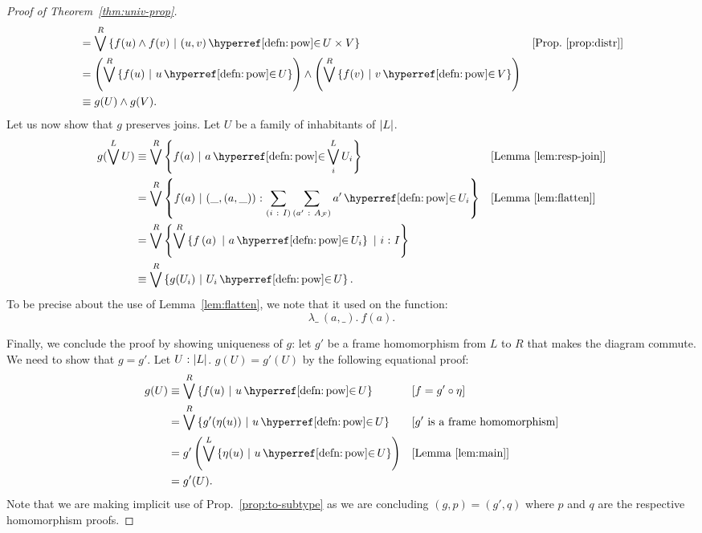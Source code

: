 \begin{proof}[Proof of Theorem~\ref{thm:univ-prop}]
\begin{align*}
             &= \bigvee^R \setof{ f(u) \wedge f(v) ~|~ (u, v) \mempownm U \times V }
               &&\text{[Prop.~\ref{prop:distr}]}                                    \\
             &= \left( \bigvee^R \setof{ f(u) ~|~ u \mempownm U } \right)
              \wedge \left( \bigvee^R \setof{ f(v) ~|~ v \mempownm V } \right)                 \\
             &\equiv g(U) \wedge g(V)                                                         .
  \end{align*}
  Let us now show that $g$ preserves joins. Let $U$ be a family of inhabitants of
  $\left| L \right|$.
  \begin{align*}
    g(\bigvee^L U) &\equiv \bigvee^R \setof{ f(a) ~|~ a \mempownm \bigvee^L_i U_i }
                && [\text{Lemma~\ref{lem:resp-join}}]\\
    &= \bigvee^R \setof{ f(a) ~|~ \oftyI{(\_, (a, \_))}{\sigmaty{i}{I}{\sigmaty{a'}{A_{\McF{}}}{a' \mempownm U_i}}} }
                && [\text{Lemma~\ref{lem:flatten}}] \\
             &= \bigvee^R \setof{ \bigvee^R \img{f}{U_i} ~|~ \oftyI{i}{I} } \\
             &\equiv \bigvee^R \setof{ g(U_i) ~|~ U_i \mempownm U }.
  \end{align*}
  To be precise about the use of Lemma~\ref{lem:flatten}, we note that it used on the
  function:
  \begin{equation*}
    \lambda\_~(a, \_).~f(a).
  \end{equation*}

  Finally, we conclude the proof by showing uniqueness of $g$: let $g'$ be a frame
  homomorphism from $L$ to $R$ that makes the diagram commute. We need to show that
  $g = g'$. Let $U\hspace{0.1mm}:\hspace{0.1mm}\left| L \right|$. $g(U) = g'(U)$ by the following equational proof:
  \begin{align*}
    g(U) &\equiv \bigvee^R \setof{ f(u) ~|~ u \mempownm U }
            &&\text{[$f = g' \circ \eta$]} \\
         &= \bigvee^R \setof{ g'(\eta(u)) ~|~ u \mempownm U }
            &&\text{[$g'$ is a frame homomorphism]} \\
         &= g'\left( \bigvee^L \setof{ \eta(u) ~|~ u \mempownm U } \right)
            &&\text{[Lemma~\ref{lem:main}]} \\
         &= g'(U).
  \end{align*}
  Note that we are making implicit use of Prop.~\ref{prop:to-subtype} as we are concluding
  $(g, p) = (g' , q)$ where $p$ and $q$ are the respective homomorphism proofs.
\end{proof}
